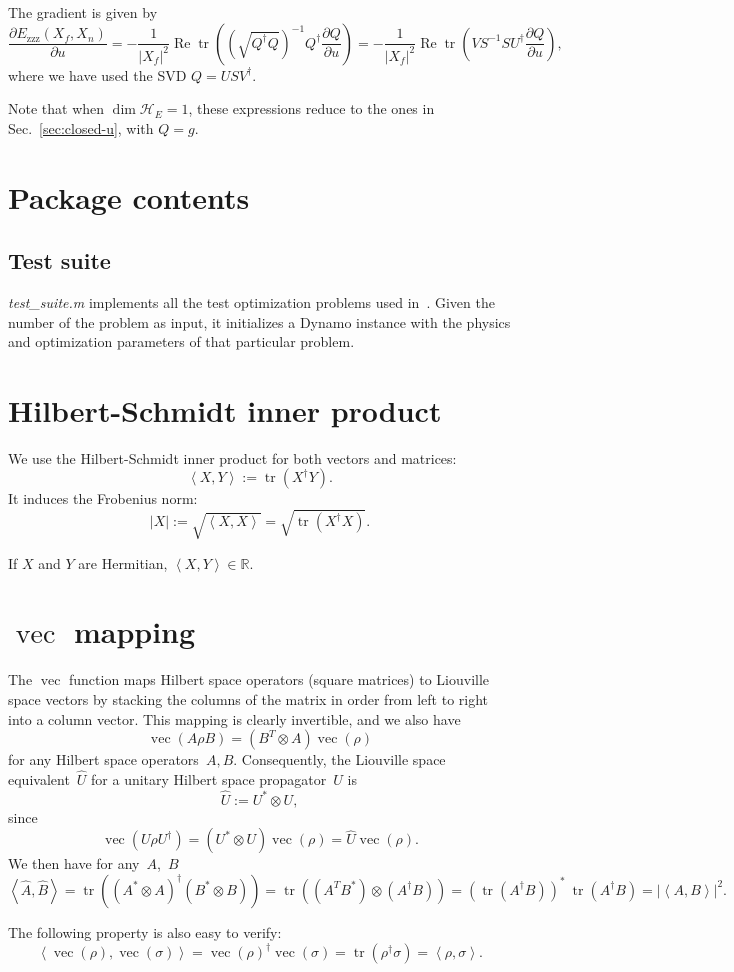 \documentclass[aps, pra, a4paper, longbibliography]{revtex4}
\newcommand{\be}{\begin{equation}}
\newcommand{\ee}{\end{equation}}
\newcommand{\R}{{\mathbb R}}  %
\newcommand{\inprod}[2]{\left\langle #1, #2 \right\rangle}
\newcommand{\hilb}[1]{\mathcal{#1}}
\DeclareMathOperator{\tr}{tr}
\DeclareMathOperator{\re}{Re}
\DeclareMathOperator{\cvec}{vec}
\newcommand{\dd}[2]{\frac{\partial #1}{\partial #2}}
\begin{document}
The gradient is given by
\be
\dd{E_\text{zzz}(X_f, X_n)}{u}
= -\frac{1}{|X_f|^2} \re \tr \left(\left(\sqrt{Q^\dagger Q}\right)^{-1} Q^\dagger \dd{Q}{u}\right)
= -\frac{1}{|X_f|^2} \re \tr \left(V S^{-1} S U^\dagger \dd{Q}{u}\right),
\ee
where we have used the SVD $Q = U S V^\dagger$.


Note that when $\dim \hilb{H}_E = 1$, these expressions reduce to the ones in Sec.~\ref{sec:closed-u},
with $Q = g$.




\section{Package contents}

\subsection{Test suite}
\emph{test\_suite.m} implements all the test optimization problems used in~\cite{machnes_2011}.
Given the number of the problem as input, it initializes a Dynamo
instance with the physics and optimization parameters of that particular problem.

\appendix
\section{Hilbert-Schmidt inner product}

We use the Hilbert-Schmidt inner product for both vectors and matrices:
\be
\inprod{X}{Y} := \tr\left(X^\dagger Y\right).
\ee
It induces the Frobenius norm:
\be
|X| := \sqrt{\inprod{X}{X}} = \sqrt{\tr\left(X^\dagger X\right)}.
\ee

If $X$ and $Y$ are Hermitian, $\inprod{X}{Y} \in \R$.

\section{$\cvec$ mapping}
\label{sec:vec}

The $\cvec$ function maps Hilbert space operators (square matrices) to
Liouville space vectors by stacking the columns of the matrix in order
from left to right into a column vector. This mapping is clearly
invertible, and we also have
\be
\cvec(A \rho B) = (B^T \otimes A) \cvec(\rho)
\ee
for any Hilbert space operators~$A, B$.
Consequently, the Liouville space equivalent~$\hat{U}$ for a unitary Hilbert space
propagator~$U$ is
\be
\label{eq:L-unitary}
\hat{U} := U^* \otimes U,
\ee
since
\be
\cvec(U \rho U^\dagger) = (U^* \otimes U) \cvec(\rho) = \hat{U} \cvec(\rho).
\ee
We then have for any~$A$,~$B$
\be
\label{eq:hat-product}
\inprod{\hat{A}}{\hat{B}}
= \tr((A^* \otimes A)^\dagger (B^* \otimes B))
= \tr((A^T B^*) \otimes (A^\dagger B))
= (\tr(A^\dagger B))^* \: \tr(A^\dagger B)
= |\inprod{A}{B}|^2.
\ee

The following property is also easy to verify:
\be
\inprod{\cvec(\rho)}{\cvec(\sigma)} = \cvec(\rho)^\dagger \cvec(\sigma)
= \tr(\rho^\dagger \sigma) = \inprod{\rho}{\sigma}.
\ee






\end{document}
